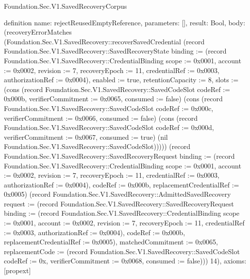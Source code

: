 \begin{lexlean}{Foundation.Sec.V1.SavedRecoveryCorpus}
\begin{semanticmodule}
definition{
  name: rejectReusedEmptyReference,
  parameters: [],
  result: Bool,
  body: (recoveryErrorMatches (Foundation.Sec.V1.SavedRecovery::recoverSavedCredential (record Foundation.Sec.V1.SavedRecovery::SavedRecoveryState {binding := (record Foundation.Sec.V1.SavedRecovery::CredentialBinding {scope := 0x0001, account := 0x0002, revision := 7, recoveryEpoch := 11, credentialRef := 0x0003, authorizationRef := 0x0004}), enabled := true, retentionCapacity := 8, slots := (cons (record Foundation.Sec.V1.SavedRecovery::SavedCodeSlot {codeRef := 0x000b, verifierCommitment := 0x0065, consumed := false}) (cons (record Foundation.Sec.V1.SavedRecovery::SavedCodeSlot {codeRef := 0x000c, verifierCommitment := 0x0066, consumed := false}) (cons (record Foundation.Sec.V1.SavedRecovery::SavedCodeSlot {codeRef := 0x000d, verifierCommitment := 0x0067, consumed := true}) (nil Foundation.Sec.V1.SavedRecovery::SavedCodeSlot))))}) (record Foundation.Sec.V1.SavedRecovery::SavedRecoveryRequest {binding := (record Foundation.Sec.V1.SavedRecovery::CredentialBinding {scope := 0x0001, account := 0x0002, revision := 7, recoveryEpoch := 11, credentialRef := 0x0003, authorizationRef := 0x0004}), codeRef := 0x000b, replacementCredentialRef := 0x0005}) (record Foundation.Sec.V1.SavedRecovery::AdmittedSavedRecovery {request := (record Foundation.Sec.V1.SavedRecovery::SavedRecoveryRequest {binding := (record Foundation.Sec.V1.SavedRecovery::CredentialBinding {scope := 0x0001, account := 0x0002, revision := 7, recoveryEpoch := 11, credentialRef := 0x0003, authorizationRef := 0x0004}), codeRef := 0x000b, replacementCredentialRef := 0x0005}), matchedCommitment := 0x0065, replacementCode := (record Foundation.Sec.V1.SavedRecovery::SavedCodeSlot {codeRef := 0x, verifierCommitment := 0x0068, consumed := false})})) 14),
  axioms: [propext]
}


\end{semanticmodule}
\end{lexlean}
